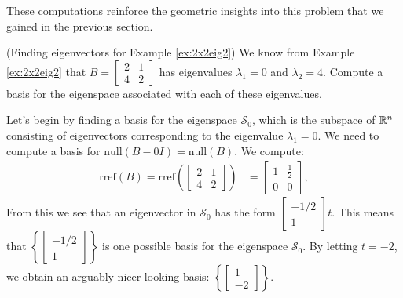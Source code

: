 \documentclass{ximera}
\begin{document}
\begin{example}
\begin{explanation}
These computations reinforce the geometric insights into this problem that we gained in the previous section.

\begin{onlineOnly}
\begin{center}
  \end{center}
  \end{onlineOnly}
\end{explanation}
\end{example}

\begin{example}\label{ex:eigvectors2x2eig2} (Finding eigenvectors for Example \ref{ex:2x2eig2}) 
We know from Example \ref{ex:2x2eig2} that $B=\begin{bmatrix} 2& 1\\ 4&2
\end{bmatrix}$ has eigenvalues $\lambda_1=0$ and $\lambda_2=4$.  Compute a basis for the eigenspace associated with each of these eigenvalues.
\begin{explanation}
Let's begin by finding a basis for the eigenspace $\mathcal{S}_0$, which is the subspace of $\mathbb{R}^n$ consisting of eigenvectors corresponding to the eigenvalue $\lambda_1=0$.  We need to compute a basis for $\mbox{null}(B-0I) = \mbox{null}(B)$.  We compute:
\begin{align*}\mbox{rref}(B)=\mbox{rref}\left(\begin{bmatrix}2&1\\4&2\end{bmatrix}\right)&=\begin{bmatrix}1&\frac{1}{2}\\0&0\end{bmatrix},
\end{align*}
From this we see that an eigenvector in $\mathcal{S}_0$ has the form $\begin{bmatrix}-1/2\\1\end{bmatrix}t$. %
This means that $\left\{\begin{bmatrix}-1/2\\1\end{bmatrix}\right\}$ is one possible basis for the eigenspace $\mathcal{S}_0$.  By letting $t=-2$, we obtain an arguably nicer-looking basis: $\left\{\begin{bmatrix}1\\-2\end{bmatrix}\right\}$. 



\end{explanation}
\end{example}
\end{document}

